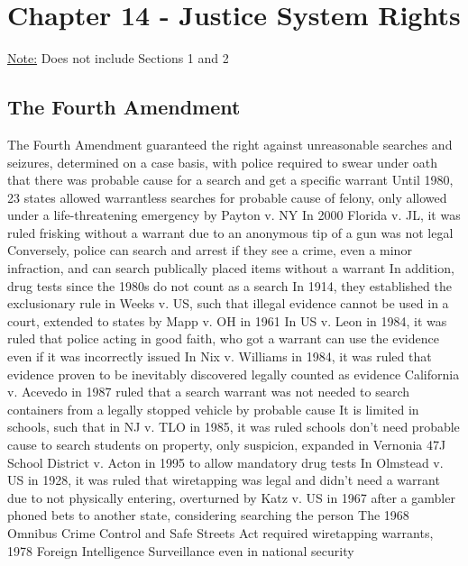 \documentclass[11 pt, twoside]{article}
\newenvironment{outline*}
{
	\begin{outline}[enumerate]
	}
	{\end{outline}
}
\begin{document}
\section{Chapter 14 - Justice System Rights}
\underline{Note:} Does not include Sections 1 and 2
\subsection{The Fourth Amendment}
\begin{outline*}
\1 The Fourth Amendment guaranteed the right against unreasonable searches and seizures, determined on a case basis, with police required to swear under oath that there was probable cause for a search and get a specific warrant
\2 Until 1980, 23 states allowed warrantless searches for probable cause of felony, only allowed under a life-threatening emergency by Payton v. NY
\2 In 2000 Florida v. JL, it was ruled frisking without a warrant due to an anonymous tip of a gun was not legal
\2 Conversely, police can search and arrest if they see a crime, even a minor infraction, and can search publically placed items without a warrant
\2 In addition, drug tests since the 1980s do not count as a search
\1 In 1914, they established the exclusionary rule in Weeks v. US, such that illegal evidence cannot be used in a court, extended to states by Mapp v. OH in 1961
\2 In US v. Leon in 1984, it was ruled that police acting in good faith, who got a warrant can use the evidence even if it was incorrectly issued
\2 In Nix v. Williams in 1984, it was ruled that evidence proven to be inevitably discovered legally counted as evidence
\1 California v. Acevedo in 1987 ruled that a search warrant was not needed to search containers from a legally stopped vehicle by probable cause
\1 It is limited in schools, such that in NJ v. TLO in 1985, it was ruled schools don’t need probable cause to search students on property, only suspicion, expanded in Vernonia 47J School District v. Acton in 1995 to allow mandatory drug tests
\1 In Olmstead v. US in 1928, it was ruled that wiretapping was legal and didn’t need a warrant due to not physically entering, overturned by Katz v. US in 1967 after a gambler phoned bets to another state, considering searching the person
\2 The 1968 Omnibus Crime Control and Safe Streets Act required wiretapping warrants, 1978 Foreign Intelligence Surveillance even in national security
\end{outline*}
\end{document}
